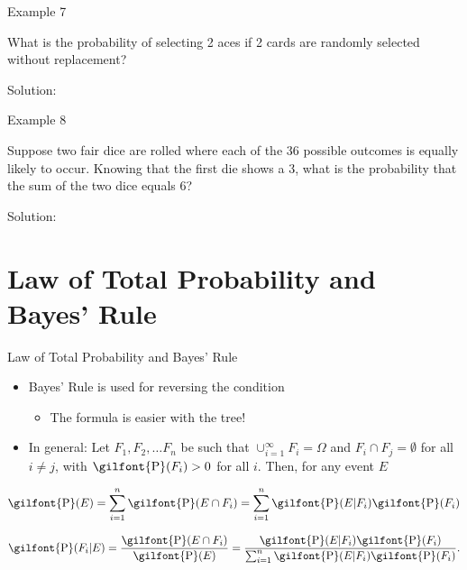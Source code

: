 \documentclass[
  ignorenonframetext,
]{beamer}
\providecommand{\tightlist}{%
  \setlength{\itemsep}{0pt}\setlength{\parskip}{0pt}}
\begin{document}
\begin{frame}{Example 7}
\label{example-7}
\begin{tcolorbox}
What is the probability of selecting 2 aces if 2 cards are randomly selected without replacement?
\end{tcolorbox}

\begin{tcolorbox}
Solution:


\vspace{30mm}

\end{tcolorbox}
\end{frame}

\begin{frame}{Example 8}
\label{example-8}
\begin{tcolorbox}
Suppose two fair dice are rolled where each of the 36 possible outcomes is equally likely to occur. Knowing that the first die shows a 3, what is the probability that the sum of the two dice equals 6?
\end{tcolorbox}

\begin{tcolorbox}
Solution: 

\vspace{30mm}


\end{tcolorbox}
\end{frame}

\section{Law of Total Probability and Bayes'
Rule}\label{law-of-total-probability-and-bayes-rule}

\begin{frame}{Law of Total Probability and Bayes' Rule}
\label{law-of-total-probability-and-bayes-rule-1}
\begin{itemize}
\item
  Bayes' Rule is used for reversing the condition

  \begin{itemize}
  \tightlist
  \item
    The formula is easier with the tree!
  \end{itemize}
\item
  In general: Let \(F_1, F_2, \ldots F_n\) be such that
  \(\cup_{i=1}^{\infty} F_i=\Omega\) and \(F_i\cap F_j=\emptyset\) for
  all \(i\neq j\), with \(\textrm{\gilfont{P}}\normalfont (F_i)>0\) for
  all \(i\). Then, for any event \(E\)
\end{itemize}

\[\textrm{\gilfont{P}}\normalfont (E)=\sum_{i=1}^n \textrm{\gilfont{P}}\normalfont (E \cap F_i)=\sum_{i=1}^n \textrm{\gilfont{P}}\normalfont (E|F_i)\textrm{\gilfont{P}}\normalfont (F_i)\]

\[\textrm{\gilfont{P}}\normalfont (F_i|E)=\frac{\textrm{\gilfont{P}}\normalfont (E \cap F_i)}{\textrm{\gilfont{P}}\normalfont (E)}=\frac{\textrm{\gilfont{P}}\normalfont (E|F_i)\textrm{\gilfont{P}}\normalfont (F_i)}{\sum_{i=1}^n\textrm{\gilfont{P}}\normalfont (E|F_i)\textrm{\gilfont{P}}\normalfont (F_i)}.\]
\end{frame}
\end{document}
